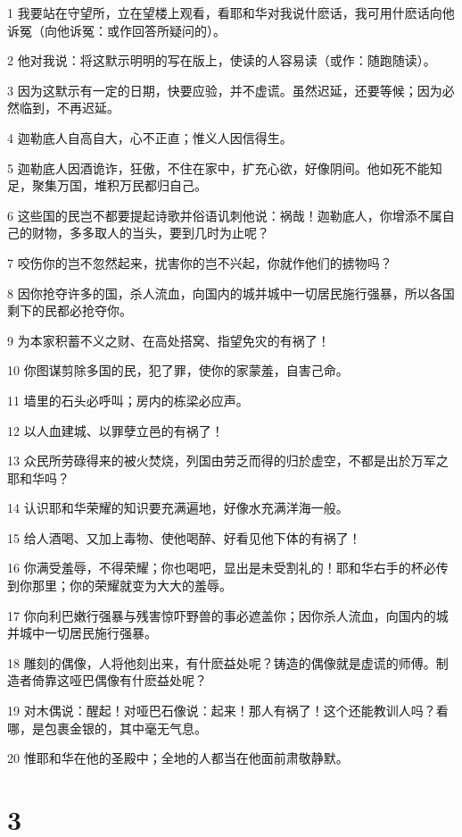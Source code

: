 \par 1 我要站在守望所，立在望楼上观看，看耶和华对我说什麽话，我可用什麽话向他诉冤（向他诉冤：或作回答所疑问的）。
\par 2 他对我说：将这默示明明的写在版上，使读的人容易读（或作：随跑随读）。
\par 3 因为这默示有一定的日期，快要应验，并不虚谎。虽然迟延，还要等候；因为必然临到，不再迟延。
\par 4 迦勒底人自高自大，心不正直；惟义人因信得生。
\par 5 迦勒底人因酒诡诈，狂傲，不住在家中，扩充心欲，好像阴间。他如死不能知足，聚集万国，堆积万民都归自己。
\par 6 这些国的民岂不都要提起诗歌并俗语讥刺他说：祸哉！迦勒底人，你增添不属自己的财物，多多取人的当头，要到几时为止呢？
\par 7 咬伤你的岂不忽然起来，扰害你的岂不兴起，你就作他们的掳物吗？
\par 8 因你抢夺许多的国，杀人流血，向国内的城并城中一切居民施行强暴，所以各国剩下的民都必抢夺你。
\par 9 为本家积蓄不义之财、在高处搭窝、指望免灾的有祸了！
\par 10 你图谋剪除多国的民，犯了罪，使你的家蒙羞，自害己命。
\par 11 墙里的石头必呼叫；房内的栋梁必应声。
\par 12 以人血建城、以罪孽立邑的有祸了！
\par 13 众民所劳碌得来的被火焚烧，列国由劳乏而得的归於虚空，不都是出於万军之耶和华吗？
\par 14 认识耶和华荣耀的知识要充满遍地，好像水充满洋海一般。
\par 15 给人酒喝、又加上毒物、使他喝醉、好看见他下体的有祸了！
\par 16 你满受羞辱，不得荣耀；你也喝吧，显出是未受割礼的！耶和华右手的杯必传到你那里；你的荣耀就变为大大的羞辱。
\par 17 你向利巴嫩行强暴与残害惊吓野兽的事必遮盖你；因你杀人流血，向国内的城并城中一切居民施行强暴。
\par 18 雕刻的偶像，人将他刻出来，有什麽益处呢？铸造的偶像就是虚谎的师傅。制造者倚靠这哑巴偶像有什麽益处呢？
\par 19 对木偶说：醒起！对哑巴石像说：起来！那人有祸了！这个还能教训人吗？看哪，是包裹金银的，其中毫无气息。
\par 20 惟耶和华在他的圣殿中；全地的人都当在他面前肃敬静默。

\chapter{3}

